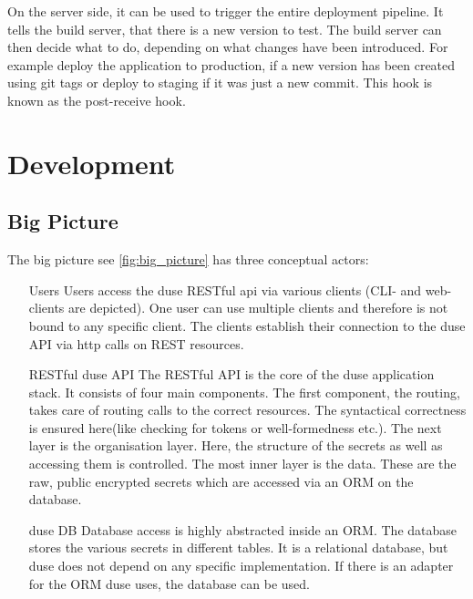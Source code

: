 On the server side, it can be used to trigger the entire deployment pipeline.
It tells the build server, that there is a new version to test. The build
server can then decide what to do, depending on what changes have been
introduced. For example deploy the application to production, if a new version
has been created using git tags or deploy to staging if it was just a new
commit. This hook is known as the post-receive hook.

\chapter{Development}

\section{Big Picture}

The big picture see \ref{fig:big_picture} has three conceptual actors:

\begin{enumerate}
  \item[Users] Users access the duse RESTful api via various
  clients (CLI- and web-clients are depicted). One user can use multiple
  clients and therefore is not bound to any specific client. The clients
  establish their connection to the duse API via http calls on REST
  resources.

  \item[RESTful duse API] The RESTful API is the core of the
  duse application stack. It consists of four main components. The first
  component, the routing, takes care of routing calls to the correct
  resources. The syntactical correctness is ensured here(like checking
  for tokens or well-formedness etc.). The next layer is the organisation
  layer. Here, the structure of the secrets as well as accessing them is
  controlled. The most inner layer is the data. These are the raw, public
  encrypted secrets which are accessed via an ORM on the database.

  \item[duse DB] Database access is highly abstracted inside an
  ORM. The database stores the various secrets in
  different tables. It is a relational database, but duse does not depend
  on any specific implementation. If there is an adapter for the ORM
  duse uses, the database can be used.
\end{enumerate}

